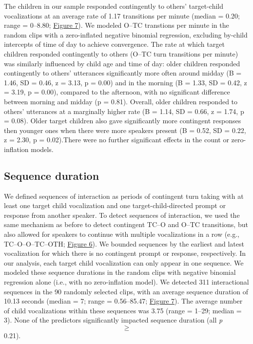 \documentclass[floatsintext,man]{apa6}
\theoremstyle{definition}
\theoremstyle{definition}
\theoremstyle{definition}
\theoremstyle{remark}
\begin{document}
The children in our sample responded contingently to others'
target-child vocalizations at an average rate of 1.17 transitions per
minute (median = 0.20; range = 0--8.80; \protect\hyperlink{fig7}{Figure
7}). We modeled O--TC transtions per minute in the random clips with a
zero-inflated negative binomial regression, excluding by-child
intercepts of time of day to achieve convergence. The rate at which
target children responded contingently to others (O--TC turn transitions
per minute) was similarly influenced by child age and time of day: older
children responded contingently to others' utterances significantly more
often around midday (B = 1.46, SD = 0.46, z = 3.13, p = 0.00) and in the
morning (B = 1.33, SD = 0.42, z = 3.19, p = 0.00), compared to the
afternoon, with no significant difference between morning and midday (p
= 0.81). Overall, older children responded to others' utterances at a
marginally higher rate (B = 1.14, SD = 0.66, z = 1.74, p = 0.08). Older
target children also gave significantly more contingent responses then
younger ones when there were more speakers present (B = 0.52, SD = 0.22,
z = 2.30, p = 0.02).There were no further significant effects in the
count or zero-inflation models.

\subsection{Sequence duration}\label{sequence-duration}

We defined sequences of interaction as periods of contingent turn taking
with at least one target child vocalization and one
target-child-directed prompt or response from another speaker. To detect
sequences of interaction, we used the same mechanism as before to detect
contingent TC--O and O--TC transitions, but also allowed for speakers to
continue with multiple vocalizations in a row (e.g., TC--O--O--TC--OTH;
\protect\hyperlink{fig6}{Figure 6}). We bounded sequences by the
earliest and latest vocalization for which there is no contingent prompt
or response, respectively. In our analysis, each target child
vocalization can only appear in one sequence. We modeled these sequence
durations in the random clips with negative binomial regression alone
(i.e., with no zero-inflation model). We detected 311 interactional
sequences in the 90 randomly selected clips, with an average sequence
duration of 10.13 seconds (median = 7; range = 0.56--85.47;
\protect\hyperlink{fig7}{Figure 7}). The average number of child
vocalizations within these sequences was 3.75 (range = 1--29; median =
3). None of the predictors significantly impacted sequence duration (all
\emph{p} \[\ge\] 0.21).
\end{document}
